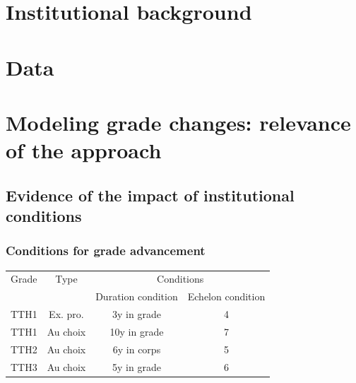 \documentclass[xcolor=table,ignorenonframetext,12pt]{beamer}
\newenvironment{choixmarges}[2]{\begin{list}{}{%
\setlength{\topsep}{0pt}%
\setlength{\leftmargin}{0pt}%
\setlength{\rightmargin}{0pt}%
\setlength{\listparindent}{\parindent}%
\setlength{\itemindent}{\parindent}%
\setlength{\parsep}{0pt plus 1pt}%
\addtolength{\leftmargin}{#1}%
\addtolength{\rightmargin}{#2}%
}\item }{\end{list}}
\begin{document}
\section{Institutional background}



\section{Data}


\section{Modeling grade changes: relevance of the approach}

\subsection{}

\subsection{Evidence of the impact of institutional conditions}


\begin{frame}

\begin{choixmarges}{-1cm}{-1cm}


\frametitle{Conditions for grade advancement}
\begin{table}
\small
\begin{tabular}{l|c|cc}

\toprule
 Grade  & Type &  \multicolumn{2}{c}{Conditions}  \\
		&  			&  Duration condition	&  Echelon condition \\
\midrule
TTH1  &	Ex. pro. 	&   3y in grade  & 	4  \\
TTH1  &	Au choix 	& 	10y in grade &	7   \\ \midrule
TTH2  & Au choix		& 	6y in corps  &	5   \\ \midrule
TTH3  & Au choix		& 	5y in grade  &	6   \\	
%	
\bottomrule
\end{tabular}
\end{table}
\end{choixmarges}
\end{frame}
\end{document}
